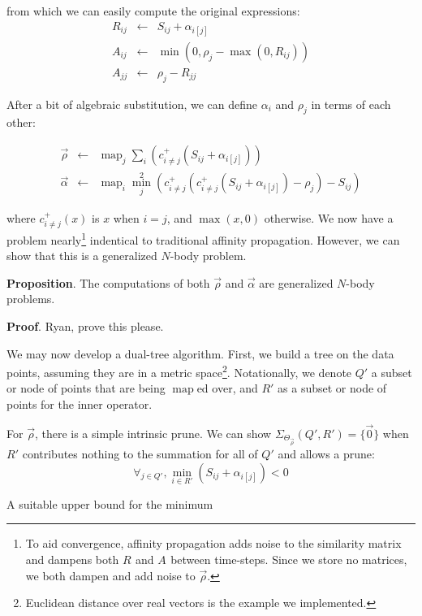 \documentclass{article}
\DeclareMathOperator*{\map}{map}
\newcommand{\eqspace}{\!\!\!\!}
\newcommand{\cpos}[2]{c^{+}_{#1 \neq #2}}
\newcommand{\respo}[2]{R_{#1#2}}
\newcommand{\avail}[2]{A_{#1#2}}
\newcommand{\simil}[2]{S_{#1#2}}
\newcommand{\vecrho}{\vec{\rho}}
\newcommand{\vecalpha}{\vec{\alpha}}
\newcommand{\frho}[1]{\rho_{#1}}
\newcommand{\falpha}[1]{\alpha_{#1}}
\newcommand{\falphaj}[2]{\alpha_{#1[#2]}}
\begin{document}
\noindent from which we can easily compute the original expressions:
\begin{eqnarray*}
  \respo{i}{j} \eqspace&\gets&\eqspace \simil{i}{j} + \falphaj{i}{j}
  \\
  \avail{i}{j} \eqspace&\gets&\eqspace \min \left(0, \frho{j} - \max(0, \respo{i}{j}) \right)
  \\
  \avail{j}{j} \eqspace&\gets&\eqspace \frho{j} - \respo{j}{j}
\end{eqnarray*}

\noindent 
After a bit of algebraic substitution, we can define $\falpha{i}$ and $\frho{j}$ in terms of each other:

\begin{eqnarray*}
  \vecrho \eqspace&\gets&\eqspace \map_{j} \sum_{i} \left( \cpos{i}{j}(\simil{i}{j} + \falphaj{i}{j}) \right)
  \\
  \vecalpha \eqspace&\gets&\eqspace \map_{i} \min^2_{j} \left( \cpos{i}{j}(\cpos{i}{j}(\simil{i}{j} + \falphaj{i}{j}) - \frho{j}) - \simil{i}{j} \right)
\end{eqnarray*}

\noindent where $\cpos{i}{j}(x)$ is $x$ when $i=j$, and $\max(x,0)$ otherwise.
We now have a problem nearly\footnote{To aid convergence, affinity propagation adds noise to the similarity matrix and dampens both $\respo{}{}$ and $\avail{}{}$ between time-steps.  Since we store no matrices, we both dampen and add noise to $\vecrho$.} indentical to traditional affinity propagation.
However, we can show that this is a generalized $N$-body problem.

{\bf Proposition}.
The computations of both $\vecrho$ and $\vecalpha$ are generalized $N$-body problems.

{\bf Proof}.
Ryan, prove this please.

We may now develop a dual-tree algorithm.
First, we build a tree on the data points, assuming they are in a metric space\footnote{Euclidean distance over real vectors is the example we implemented.}.
Notationally, we denote $Q'$ a subset or node of points that are being $\map$ed over, and $R'$ as a subset or node of points for the inner operator.

For $\vecrho$, there is a simple intrinsic prune.
We can show $\Sigma_{\Theta_{\vecrho}}(Q', R') = \{\vec{0}\}$ when $R'$ contributes nothing to the summation for all of $Q'$ and allows a prune:
$$\forall_{j \in Q'}, \min_{i \in R'} \left( \simil{i}{j} + \falphaj{i}{j} \right) < 0$$

A suitable upper bound for the minimum
\end{document}
